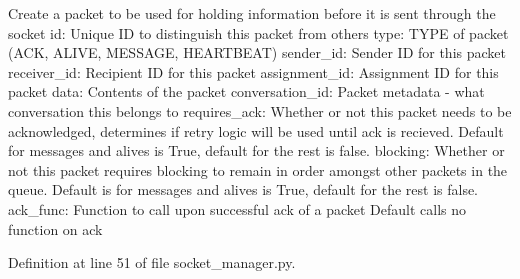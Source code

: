 \begin{DoxyVerb}Create a packet to be used for holding information before it is
sent through the socket
id:               Unique ID to distinguish this packet from others
type:             TYPE of packet (ACK, ALIVE, MESSAGE, HEARTBEAT)
sender_id:        Sender ID for this packet
receiver_id:      Recipient ID for this packet
assignment_id:    Assignment ID for this packet
data:             Contents of the packet
conversation_id:  Packet metadata - what conversation this belongs to
requires_ack:     Whether or not this packet needs to be acknowledged,
           determines if retry logic will be used until ack is
           recieved. Default for messages and alives is True,
           default for the rest is false.
blocking:         Whether or not this packet requires blocking to
           remain in order amongst other packets in the queue.
           Default is for messages and alives is True, default
           for the rest is false.
ack_func:         Function to call upon successful ack of a packet
           Default calls no function on ack
\end{DoxyVerb}
 

Definition at line 51 of file socket\+\_\+manager.\+py.


